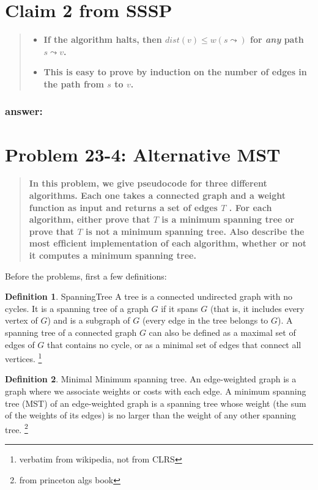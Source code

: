 \documentclass[titlepage]{article}\usepackage[]{graphicx}\usepackage[]{color}
\theoremstyle{definition}
\newtheorem{definition}{Definition}[section]
\begin{document}
\section{Claim 2 from SSSP}
\begin{quote}
\begin{itemize}
  \item \textbf{ If the algorithm halts, then $dist(v) \leq w(s \leadsto )$
	  for \emph{any} path $s \leadsto v$.}
  \item \textbf{This is easy to prove by induction on the number of edges in
	the path from $s$ to $v$.}
\end{itemize}
\end{quote}
\subsubsection{answer:}
\vspace{8cm}



\section{Problem 23-4: Alternative MST}

\begin{quote}
  \textbf{ In this problem, we give pseudocode for three different algorithms.
	Each one takes a connected graph and a weight function as input and returns
	a set of edges $T$ .  For each algorithm, either prove that $T$ is a
	minimum spanning tree or prove that $T$ is not a minimum spanning tree.
	Also describe the most efﬁcient implementation of each algorithm, whether or
	not it computes a minimum spanning tree.  }
\end{quote}

Before the problems, first a few definitions:

\theoremstyle{definition}
\begin{definition}{SpanningTree}
  A tree is a connected undirected graph with no cycles. It is a spanning tree
  of a graph $G$ if it spans $G$ (that is, it includes every vertex of $G$) and is a
  subgraph of $G$ (every edge in the tree belongs to $G$). A spanning tree of a
  connected graph $G$ can also be defined as a maximal set of edges of $G$ that
  contains no cycle, or as a minimal set of edges that connect all vertices.
  \footnote{verbatim from wikipedia, not from CLRS}
\end{definition}
\begin{definition}{Minimal}
  Minimum spanning tree. An edge-weighted graph is a graph where we associate
  weights or costs with each edge. A minimum spanning tree (MST) of an
  edge-weighted graph is a spanning tree whose weight (the sum of the weights
  of its edges) is no larger than the weight of any other spanning tree.
  \footnote{from princeton algs book}
\end{definition}
\end{document}
